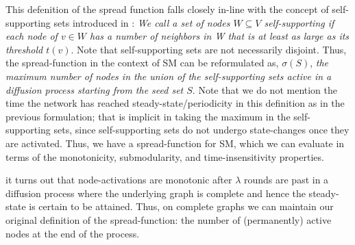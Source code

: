 \documentclass[twocolumn, 10pt]{article}
\begin{document}
This defenition of the spread function falls closely in-line with the concept of self-supporting sets introduced in \cite{vig}: \textit{We call a set of nodes $W \subseteq V$ self-supporting if each node of $v \in W$ has a number of neighbors in W that is at least as large as its threshold $t(v)$\cite{vig}}. Note that self-supporting sets are not necessarily disjoint. Thus, the spread-function in the context of SM can be reformulated as, $\sigma(S)$, \textit{the maximum number of nodes in the union of the self-supporting sets active in a diffusion process starting from the seed set $S$}. Note that we do not mention the time the network has reached steady-state/periodicity in this definition as in the previous formulation; that is implicit in taking the maximum in the self-supporting sets, since self-supporting sets do not undergo state-changes once they are activated. Thus, we have a spread-function for SM, which we can evaluate in terms of the monotonicity, submodularity, and time-insensitivity properties.


it turns out that node-activations are monotonic after $\lambda$ rounds are past in a diffusion process where the underlying graph is complete and hence the steady-state is certain to be attained. Thus, on complete graphs we can maintain our original definition of the spread-function: the number of (permanently) active nodes at the end of the process. 
\end{document}
